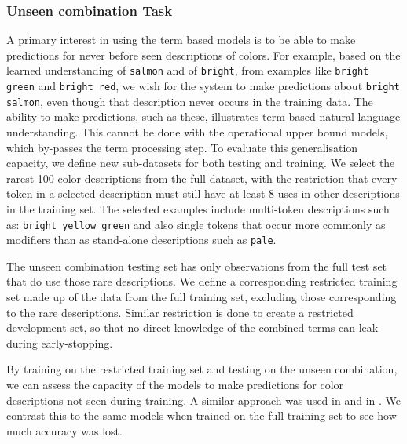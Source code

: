 \documentclass[]{book}
\newcommand{\textcite}{\citet}
\begin{document}
\subsubsection{Unseen combination Task} \label{sec:extrapodata}
A primary interest in using the term based models is to be able to make predictions for never before seen descriptions of colors.
For example, based on the learned understanding of \texttt{salmon} and of \texttt{bright}, from examples like \texttt{bright green} and \texttt{bright red}, we wish for the system to make predictions about \texttt{bright salmon}, even though that description never occurs in the training data.
The ability to make predictions, such as these, illustrates term-based natural language understanding.
This cannot be done with the operational upper bound models, which by-passes the term processing step.
%
To evaluate this generalisation capacity, we define new sub-datasets for both testing and training.
We select the rarest 100 color descriptions from the full dataset,
with the restriction that every token in a selected description must still have at least 8 uses in other descriptions in the training set.
The selected examples include multi-token descriptions such as: \texttt{bright yellow green} and also single tokens that occur more commonly as modifiers than as stand-alone descriptions such as \texttt{pale}.

The unseen combination testing set has only observations from the full test set that do use those rare descriptions.
We define a corresponding restricted training set made up of the data from the full training set, excluding those  corresponding to the rare descriptions.
Similar restriction is done to create a restricted development set, so that no direct knowledge of the combined terms can leak during early-stopping.


By training on the restricted training set and testing on the unseen combination, we can assess the capacity of the models to make predictions for color descriptions not seen during training.
A similar approach was used in \textcite{acl2018WinnLighter} and in \textcite{DBLP:journals/corr/AtzmonBKGC16}.
We contrast this to the same models when trained on the full training set to see how much accuracy was lost.
\end{document}
